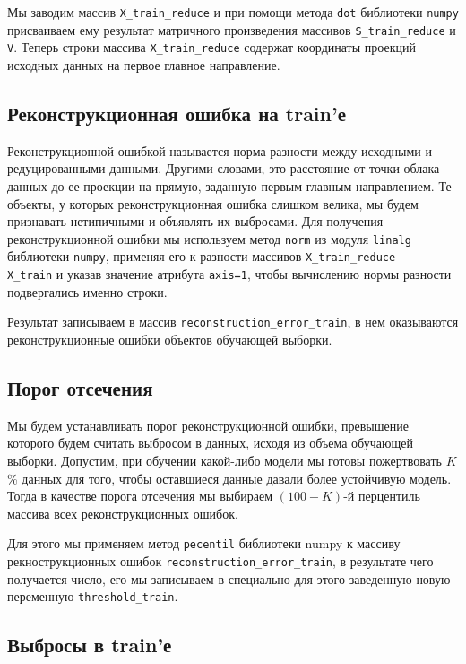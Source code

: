 \documentclass[a4paper,12pt]{article}
\begin{document}
Мы заводим массив \texttt{X\_train\_reduce} и при помощи метода \texttt{dot} библиотеки \texttt{numpy} присваиваем ему результат матричного произведения массивов \texttt{S\_train\_reduce} и \texttt{V}. Теперь строки массива \texttt{X\_train\_reduce} содержат координаты проекций исходных данных на первое главное направление. 

\subsection{Реконструкционная ошибка на train'е}

Реконструкционной ошибкой называется норма разности между исходными и редуцированными данными. Другими словами, это расстояние от точки облака данных до ее проекции на прямую, заданную первым главным направлением. Те объекты, у которых реконструкционная ошибка слишком велика, мы будем признавать нетипичными и объявлять их выбросами.
Для получения реконструкционной ошибки мы используем метод \texttt{norm} из модуля \texttt{linalg} библиотеки \texttt{numpy}, применяя его к разности массивов \texttt{X\_train\_reduce - X\_train} и указав значение атрибута \texttt{axis=1}, чтобы вычислению нормы разности подвергались именно строки. 

Результат записываем в массив \texttt{reconstruction\_error\_train}, в нем оказываются реконструкционные ошибки объектов обучающей выборки.

\subsection{Порог отсечения}

Мы будем устанавливать порог реконструкционной ошибки, превышение которого будем считать выбросом в данных, исходя из объема обучающей выборки. Допустим, при обучении какой-либо модели мы готовы пожертвовать $K$\% данных для того, чтобы оставшиеся данные давали более устойчивую модель. Тогда в качестве порога отсечения мы выбираем $(100 - K)$-й перцентиль массива всех реконструкционных ошибок.

Для этого мы применяем метод \texttt{pecentil} библиотеки numpy к массиву рекнострукционных ошибок \texttt{reconstruction\_error\_train}, в результате чего получается число, его мы записываем в специально для этого заведенную новую переменную \texttt{threshold\_train}.

\subsection{Выбросы в train'е}
\end{document}
